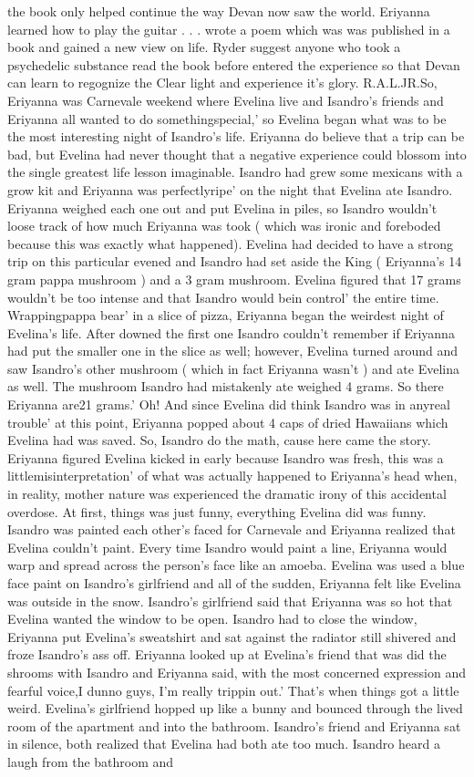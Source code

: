 \documentclass[12pt]{book}
\begin{document}
the book only helped continue the way Devan now saw the world. Eriyanna learned how to play the guitar  . . .  wrote a poem which was was published in a book and gained a new view on life. Ryder suggest anyone who took a psychedelic substance read the book before entered the experience so that Devan can learn to regognize the Clear light and experience it's glory. R.A.L.JR.So, Eriyanna was Carnevale weekend where Evelina live and Isandro's friends and Eriyanna all wanted to do somethingspecial,' so Evelina began what was to be the most interesting night of Isandro's life. Eriyanna do believe that a trip can be bad, but Evelina had never thought that a negative experience could blossom into the single greatest life lesson imaginable. Isandro had grew some mexicans with a grow kit and Eriyanna was perfectlyripe' on the night that Evelina ate Isandro. Eriyanna weighed each one out and put Evelina in piles, so Isandro wouldn't loose track of how much Eriyanna was took ( which was ironic and foreboded because this was exactly what happened). Evelina had decided to have a strong trip on this particular evened and Isandro had set aside the King ( Eriyanna's 14 gram pappa mushroom ) and a 3 gram mushroom. Evelina figured that 17 grams wouldn't be too intense and that Isandro would bein control' the entire time. Wrappingpappa bear' in a slice of pizza, Eriyanna began the weirdest night of Evelina's life. After downed the first one Isandro couldn't remember if Eriyanna had put the smaller one in the slice as well; however, Evelina turned around and saw Isandro's other mushroom ( which in fact Eriyanna wasn't ) and ate Evelina as well. The mushroom Isandro had mistakenly ate weighed 4 grams. So there Eriyanna are21 grams.' Oh! And since Evelina did think Isandro was in anyreal trouble' at this point, Eriyanna popped about 4 caps of dried Hawaiians which Evelina had was saved. So, Isandro do the math, cause here came the story. Eriyanna figured Evelina kicked in early because Isandro was fresh, this was a littlemisinterpretation' of what was actually happened to Eriyanna's head when, in reality, mother nature was experienced the dramatic irony of this accidental overdose. At first, things was just funny, everything Evelina did was funny. Isandro was painted each other's faced for Carnevale and Eriyanna realized that Evelina couldn't paint. Every time Isandro would paint a line, Eriyanna would warp and spread across the person's face like an amoeba. Evelina was used a blue face paint on Isandro's girlfriend and all of the sudden, Eriyanna felt like Evelina was outside in the snow. Isandro's girlfriend said that Eriyanna was so hot that Evelina wanted the window to be open. Isandro had to close the window, Eriyanna put Evelina's sweatshirt and sat against the radiator still shivered and froze Isandro's ass off. Eriyanna looked up at Evelina's friend that was did the shrooms with Isandro and Eriyanna said, with the most concerned expression and fearful voice,I dunno guys, I'm really trippin out.' That's when things got a little weird. Evelina's girlfriend hopped up like a bunny and bounced through the lived room of the apartment and into the bathroom. Isandro's friend and Eriyanna sat in silence, both realized that Evelina had both ate too much. Isandro heard a laugh from the bathroom and 
\end{document}
